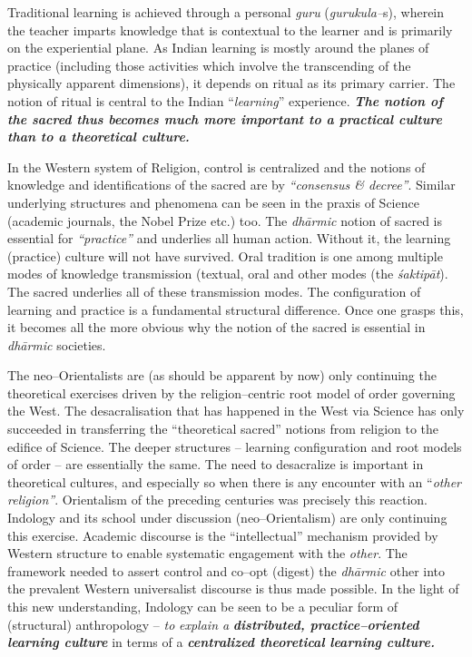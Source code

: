 Traditional learning is achieved through a personal \textit{guru} (\textit{gurukula–}s), wherein the teacher imparts knowledge that is contextual to the learner and is primarily on the experiential plane. As Indian learning is mostly around the planes of practice (including those activities which involve the transcending of the physically apparent dimensions), it depends on ritual as its primary carrier. The notion of ritual is central to the Indian “\textit{learning}” experience. \textbf{\textit{The notion of the sacred thus becomes much more important to a practical culture than to a theoretical culture.}}

In the Western system of Religion, control is centralized and the notions of knowledge and identifications of the sacred are by \textit{“consensus \& decree”}. Similar underlying structures and phenomena can be seen in the praxis of Science (academic journals, the Nobel Prize etc.) too. The \textit{dhārmic} notion of sacred is essential for \textit{“practice”} and underlies all human action. Without it, the learning (practice) culture will not have survived. Oral tradition is one among multiple modes of knowledge transmission (textual, oral and other modes (the \textit{śaktipāt}). The sacred underlies all of these transmission modes. The configuration of learning and practice is a fundamental structural difference. Once one grasps this, it becomes all the more obvious why the notion of the sacred is essential in \textit{dhārmic} societies.

The neo–Orientalists are (as should be apparent by now) only continuing the theoretical exercises driven by the religion–centric root model of order governing the West. The desacralisation that has happened in the West via Science has only succeeded in transferring the “theoretical sacred” notions from religion to the edifice of Science. The deeper structures – learning configuration and root models of order – are essentially the same. The need to desacralize is important in theoretical cultures, and especially so when there is any encounter with an “\textit{other religion”}. Orientalism of the preceding centuries was precisely this reaction. Indology and its school under discussion (neo–Orientalism) are only continuing this exercise. Academic discourse is the “intellectual” mechanism provided by Western structure to enable systematic engagement with the \textit{other}. The framework needed to assert control and co–opt (digest) the \textit{dhārmic} other into the prevalent Western universalist discourse is thus made possible. In the light of this new understanding, Indology can be seen to be a peculiar form of (structural) anthropology – \textit{to} \textit{explain a } \textbf{\textit{distributed, practice–oriented learning culture}} in terms of a \textbf{\textit{centralized theoretical learning culture.}}


